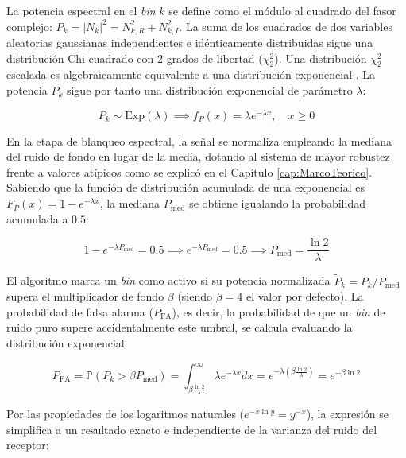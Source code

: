 La potencia espectral en el \textit{bin} $k$ se define como el módulo al cuadrado del fasor complejo: $P_k = |N_k|^2 = N_{k,R}^2 + N_{k,I}^2$. La suma de los cuadrados de dos variables aleatorias gaussianas independientes e idénticamente distribuidas sigue una distribución Chi-cuadrado con 2 grados de libertad ($\chi^2_2$). Una distribución $\chi^2_2$ escalada es algebraicamente equivalente a una distribución exponencial \cite{kay_fundamentals_1998}. La potencia $P_k$ sigue por tanto una distribución exponencial de parámetro $\lambda$:

\begin{equation}
    P_k \sim \text{Exp}(\lambda) \implies f_{P}(x) = \lambda e^{-\lambda x}, \quad x \ge 0
\end{equation}

En la etapa de blanqueo espectral, la señal se normaliza empleando la mediana del ruido de fondo en lugar de la media, dotando al sistema de mayor robustez frente a valores atípicos como se explicó en el Capítulo \ref{cap:MarcoTeorico}. Sabiendo que la función de distribución acumulada de una exponencial es $F_P(x) = 1 - e^{-\lambda x}$, la mediana $P_{\text{med}}$ se obtiene igualando la probabilidad acumulada a $0.5$:

\begin{equation}
    1 - e^{-\lambda P_{\text{med}}} = 0.5 \implies e^{-\lambda P_{\text{med}}} = 0.5 \implies P_{\text{med}} = \frac{\ln 2}{\lambda}
\end{equation}

El algoritmo marca un \textit{bin} como activo si su potencia normalizada $\tilde{P}_k = P_k / P_{\text{med}}$ supera el multiplicador de fondo $\beta$ (siendo $\beta = 4$ el valor por defecto). La probabilidad de falsa alarma ($P_{\text{FA}}$), es decir, la probabilidad de que un \textit{bin} de ruido puro supere accidentalmente este umbral, se calcula evaluando la distribución exponencial:

\begin{equation}
    P_{\text{FA}} = \mathbb{P}\left(P_k > \beta P_{\text{med}}\right) = \int_{\beta \frac{\ln 2}{\lambda}}^{\infty} \lambda e^{-\lambda x} dx = e^{-\lambda \left(\beta \frac{\ln 2}{\lambda}\right)} = e^{-\beta \ln 2}
\end{equation}

Por las propiedades de los logaritmos naturales ($e^{-x \ln y} = y^{-x}$), la expresión se simplifica a un resultado exacto e independiente de la varianza del ruido del receptor:

